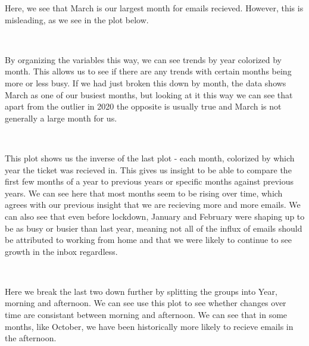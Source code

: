 \documentclass[11pt]{article}
\begin{document}
    Here, we see that March is our largest month for emails recieved.
However, this is misleading, as we see in the plot below.

    \begin{center}
    \end{center}
    { \hspace*{\fill} \\}
    
    By organizing the variables this way, we can see trends by year
colorized by month. This allows us to see if there are any trends with
certain months being more or less busy. If we had just broken this down
by month, the data shows March as one of our busiest months, but looking
at it this way we can see that apart from the outlier in 2020 the
opposite is usually true and March is not generally a large month for
us.


    \begin{center}
    \end{center}
    { \hspace*{\fill} \\}
    
    This plot shows us the inverse of the last plot - each month, colorized
by which year the ticket was recieved in. This gives us insight to be
able to compare the first few months of a year to previous years or
specific months against previous years. We can see here that most months
seem to be rising over time, which agrees with our previous insight that
we are recieving more and more emails. We can also see that even before
lockdown, January and February were shaping up to be as busy or busier
than last year, meaning not all of the influx of emails should be
attributed to working from home and that we were likely to continue to
see growth in the inbox regardless.


    \begin{center}
    \end{center}
    { \hspace*{\fill} \\}
    
    Here we break the last two down further by splitting the groups into
Year, morning and afternoon. We can see use this plot to see whether
changes over time are consistant between morning and afternoon. We can
see that in some months, like October, we have been historically more
likely to recieve emails in the afternoon.
\end{document}
